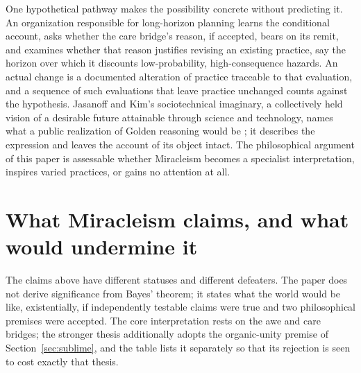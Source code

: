 One hypothetical pathway makes the possibility concrete without predicting
it. An organization responsible for long-horizon planning learns the
conditional account, asks whether the care bridge's reason, if accepted,
bears on its remit, and examines whether that reason justifies revising an
existing practice, say the horizon over which it discounts low-probability,
high-consequence hazards. An actual change is a documented alteration of
practice traceable to that evaluation, and a sequence of such evaluations
that leave practice unchanged counts against the hypothesis. Jasanoff and
Kim's sociotechnical imaginary, a collectively held vision of a desirable
future attainable through science and technology, names what a public
realization of Golden reasoning would be \cite{JasanoffKim15}; it describes
the expression and leaves the account of its object intact. The philosophical
argument of this paper is assessable whether Miracleism becomes a specialist
interpretation, inspires varied practices, or gains no attention at all.

\section{What Miracleism claims, and what would undermine it}\label{sec:ladder}

The claims above have different statuses and different defeaters. The paper
does not derive significance from Bayes' theorem; it states what the world
would be like,
existentially, if independently testable claims were true and two
philosophical premises were accepted. The core interpretation rests on the
awe and care bridges; the stronger thesis additionally adopts the
organic-unity premise of Section~\ref{sec:sublime}, and the table lists it
separately so that its rejection is seen to cost exactly that thesis.

